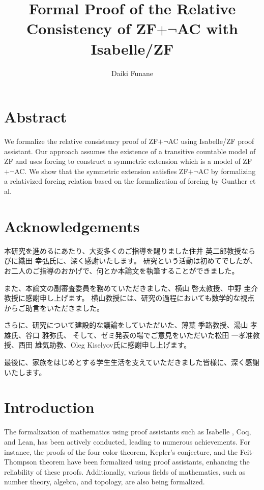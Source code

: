 \documentclass{report}
\title{Formal Proof of the Relative Consistency of ZF$+\neg$AC with Isabelle/ZF}
\author{Daiki Funane}
\affil{Graduate School of Information Sciences, Tohoku University \\
(Draft of Master's Thesis)}
\begin{document}
\maketitle

\chapter*{Abstract}
We formalize the relative consistency proof of ZF$+\neg$AC using Isabelle/ZF proof assistant.
Our approach assumes the existence of a transitive countable model of ZF and uses forcing to construct a symmetric extension which is a model of ZF$+\neg$AC.
We show that the symmetric extension satisfies ZF$+\neg$AC by formalizing a relativized forcing relation based on the formalization of forcing by Gunther et al.

\chapter*{Acknowledgements}
本研究を進めるにあたり、大変多くのご指導を賜りました住井 英二郎教授ならびに織田 幸弘氏に、深く感謝いたします。
研究という活動は初めてでしたが、お二人のご指導のおかげで、何とか本論文を執筆することができました。

また、本論文の副審査委員を務めていただきました、横山 啓太教授、中野 圭介教授に感謝申し上げます。
横山教授には、研究の過程においても数学的な視点からご助言をいただきました。

さらに、研究について建設的な議論をしていただいた、薄葉 季路教授、湯山 孝雄氏、谷口 雅弥氏、
そして、ゼミ発表の場でご意見をいただいた松田 一孝准教授、西田 雄気助教、Oleg Kiselyov氏に感謝申し上げます。

最後に、家族をはじめとする学生生活を支えていただきました皆様に、深く感謝いたします。

\clearpage
\tableofcontents
\clearpage




\chapter{Introduction}
The formalization of mathematics using proof assistants such as Isabelle \cite{paulson_1986}, Coq, and Lean, has been actively conducted, leading to numerous achievements. 
For instance, the proofs of the four color theorem, Kepler's conjecture, and the Feit-Thompson theorem have been formalized using proof assistants, enhancing the reliability of these proofs. 
Additionally, various fields of mathematics, such as number theory, algebra, and topology, are also being formalized.
\end{document}
